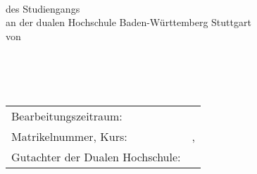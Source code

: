 \documentclass[main.tex]{subfiles}
\begin{document}
\begin{titlepage}
	\thispagestyle{firstPageStyle}
	\renewcommand{\baselinestretch}{1.0}
	\begin{center}
	        ~\\
	        \vspace{1cm}
		\large{{\titel}}\\
		\vspace{1cm}
		\large{\textbf{{\kind}}}\\
		\vspace{2cm}
		des Studiengangs {{\course}}\\
		an der dualen Hochschule Baden-Württemberg Stuttgart\\
		\vspace{1cm}
		von\\
		{{\Author}}\\
		\vspace{1.5cm}
		{{\duedate}}\\
		\vspace{2cm}
	\end{center}
	~
	\vspace{2cm}
	~
	\begingroup
	\centering
	\begin{tabular}{ll}
		Bearbeitungszeitraum:			& { {\bearbeitungszeit} }  \\ 
		Matrikelnummer, Kurs: 			& { {\matriculationno, \kurs}} \\ 
		Gutachter der Dualen Hochschule: 	& { {\supervisordhbw}} \\ [5ex]
	\end{tabular}
	\endgroup
	\vfill 
\end{titlepage}
\end{document}
